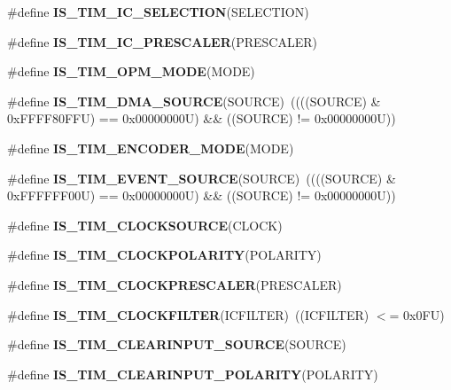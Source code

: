 \begin{DoxyCompactItemize}
\#define {\bfseries I\+S\+\_\+\+T\+I\+M\+\_\+\+I\+C\+\_\+\+S\+E\+L\+E\+C\+T\+I\+ON}(S\+E\+L\+E\+C\+T\+I\+ON)
\item 
\#define {\bfseries I\+S\+\_\+\+T\+I\+M\+\_\+\+I\+C\+\_\+\+P\+R\+E\+S\+C\+A\+L\+ER}(P\+R\+E\+S\+C\+A\+L\+ER)
\item 
\#define {\bfseries I\+S\+\_\+\+T\+I\+M\+\_\+\+O\+P\+M\+\_\+\+M\+O\+DE}(M\+O\+DE)
\item 
\mbox{\label{group___t_i_m___i_s___t_i_m___definitions_gafb9cb1995ea4cd37db6032d80a49cd47}} 
\#define {\bfseries I\+S\+\_\+\+T\+I\+M\+\_\+\+D\+M\+A\+\_\+\+S\+O\+U\+R\+CE}(S\+O\+U\+R\+CE)~((((S\+O\+U\+R\+CE) \& 0x\+F\+F\+F\+F80\+F\+F\+U) == 0x00000000\+U) \&\& ((\+S\+O\+U\+R\+C\+E) != 0x00000000\+U))
\item 
\#define {\bfseries I\+S\+\_\+\+T\+I\+M\+\_\+\+E\+N\+C\+O\+D\+E\+R\+\_\+\+M\+O\+DE}(M\+O\+DE)
\item 
\mbox{\label{group___t_i_m___i_s___t_i_m___definitions_ga4ac88c3e43c8250114ea81a6e052d58a}} 
\#define {\bfseries I\+S\+\_\+\+T\+I\+M\+\_\+\+E\+V\+E\+N\+T\+\_\+\+S\+O\+U\+R\+CE}(S\+O\+U\+R\+CE)~((((S\+O\+U\+R\+CE) \& 0x\+F\+F\+F\+F\+F\+F00\+U) == 0x00000000\+U) \&\& ((\+S\+O\+U\+R\+C\+E) != 0x00000000\+U))
\item 
\#define {\bfseries I\+S\+\_\+\+T\+I\+M\+\_\+\+C\+L\+O\+C\+K\+S\+O\+U\+R\+CE}(C\+L\+O\+CK)
\item 
\#define {\bfseries I\+S\+\_\+\+T\+I\+M\+\_\+\+C\+L\+O\+C\+K\+P\+O\+L\+A\+R\+I\+TY}(P\+O\+L\+A\+R\+I\+TY)
\item 
\#define {\bfseries I\+S\+\_\+\+T\+I\+M\+\_\+\+C\+L\+O\+C\+K\+P\+R\+E\+S\+C\+A\+L\+ER}(P\+R\+E\+S\+C\+A\+L\+ER)
\item 
\mbox{\label{group___t_i_m___i_s___t_i_m___definitions_gaf1c65e593d3aabc6f7288108cb75aab7}} 
\#define {\bfseries I\+S\+\_\+\+T\+I\+M\+\_\+\+C\+L\+O\+C\+K\+F\+I\+L\+T\+ER}(I\+C\+F\+I\+L\+T\+ER)~((I\+C\+F\+I\+L\+T\+ER) $<$= 0x0\+F\+U)
\item 
\#define {\bfseries I\+S\+\_\+\+T\+I\+M\+\_\+\+C\+L\+E\+A\+R\+I\+N\+P\+U\+T\+\_\+\+S\+O\+U\+R\+CE}(S\+O\+U\+R\+CE)
\item 
\#define {\bfseries I\+S\+\_\+\+T\+I\+M\+\_\+\+C\+L\+E\+A\+R\+I\+N\+P\+U\+T\+\_\+\+P\+O\+L\+A\+R\+I\+TY}(P\+O\+L\+A\+R\+I\+TY)
\item 

\end{DoxyCompactItemize}
